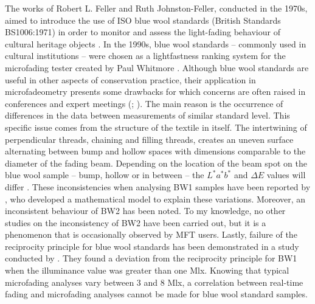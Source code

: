 The works of Robert L. Feller and Ruth Johnston-Feller, conducted in the 1970s, aimed to introduce the use of ISO blue wool standards (British Standards BS1006:1971) in order to monitor and assess the light-fading behaviour of cultural heritage objects \citep{feller_further_1978, feller_use_1978, feller_continued_1981}. In the 1990s, blue wool standards – commonly used in cultural institutions \citep{bullock_measurement_1999, derbyshire_proposed_1999} – were chosen as a lightfastness ranking system for the microfading tester created by Paul Whitmore \citep[400-401]{whitmore_predicting_1999}. Although blue wool standards are useful in other aspects of conservation practice, their application in microfadeometry presents some drawbacks for which concerns are often raised in conferences and expert meetings (\citealp[13]{beltran_microfading_2021}; \citealp{del_hoyo-melendez_limitations_2016}). The main reason is the occurrence of differences in the data between measurements of similar standard level. This specific issue comes from the structure of the textile in itself. The intertwining of perpendicular threads, chaining and filling threads, creates an uneven surface alternating between bump and hollow spaces with dimensions comparable to the diameter of the fading beam. Depending on the location of the beam spot on the blue wool sample – bump, hollow or in between – the $L^*a^*b^*$ and $\Delta E$ values will differ \citep{prestel_alternative_2016}. These inconsistencies when analysing BW1 samples have been reported by \citet[Figure 4]{mecklenburg_development_2012}, who developed a mathematical model to explain these variations. Moreover, an inconsistent behaviour of BW2 has been noted. To my knowledge, no other studies on the inconsistency of BW2 have been carried out, but it is a phenomenon that is occasionally observed by MFT users. Lastly, failure of the reciprocity principle for blue wool standards has been demonstrated in a study conducted by \cite{del_hoyo-melendez_investigation_2011}. They found a deviation from the reciprocity principle for BW1 when the illuminance value was greater than one \unit{\mega\lux}. Knowing that typical microfading analyses vary between 3 and 8 \unit{\mega\lux}, a correlation between real-time fading and microfading analyses cannot be made for blue wool standard samples.\\

